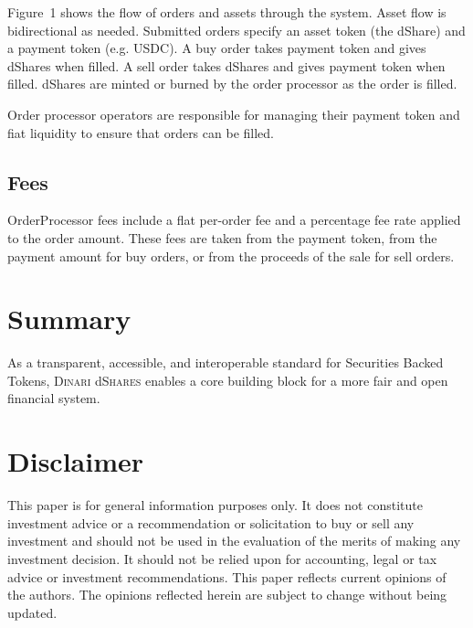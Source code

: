 \documentclass[sigconf,nonacm,prologue,table]{acmart}
\newcommand{\dshares}{\textsc{Dinari} d\textsc{Shares} }
\begin{document}
Figure~1 shows the flow of orders and assets through the system. Asset flow is bidirectional as needed. Submitted orders specify an asset token (the dShare) and a payment token (e.g. USDC). A buy order takes payment token and gives dShares when filled. A sell order takes dShares and gives payment token when filled. dShares are minted or burned by the order processor as the order is filled. 

Order processor operators are responsible for managing their payment token and fiat liquidity to ensure that orders can be filled.

\subsection{Fees}

OrderProcessor fees include a flat per-order fee and a percentage fee rate applied to the order amount. These fees are taken from the payment token, from the payment amount for buy orders, or from the proceeds of the sale for sell orders.

\section{Summary}

As a transparent, accessible, and interoperable standard for Securities Backed Tokens, \dshares enables a core building block for a more fair and open financial system.

% 
% 

\section*{Disclaimer}

This paper is for general information purposes only. It does not constitute investment advice or a recommendation or solicitation to buy or sell any investment and should not be used in the evaluation of the merits of making any investment decision. It should not be relied upon for accounting, legal or tax advice or investment recommendations.  This paper reflects current opinions of the authors. The opinions reflected herein are subject to change without being updated. 
\end{document}
